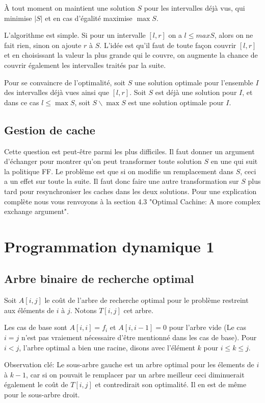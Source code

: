 \documentclass[12pt]{article}
\begin{document}
À tout moment on maintient une solution $S$ pour les intervalles déjà vus, qui minimise $|S|$ et en cas d'égalité maximise $\max S$.

L'algorithme est simple.  Si pour un intervalle $[l,r]$ on a $l\leq max S$, alors on ne fait rien, sinon on ajoute $r$ à $S$.
L'idée est qu'il faut de toute façon couvrir $[l,r]$ et en choisissant la valeur la plus grande qui le couvre, on augmente la chance de couvrir également les intervalles traités par la suite.

Pour se convaincre de l'optimalité, soit $S$ une solution optimale pour l'ensemble $I$ des intervalles déjà vues ainsi que $[l,r]$.  Soit $S$ est déjà une solution pour $I$, et dans ce cas $l\leq \max S$, soit $S\backslash \max S$ est une solution optimale pour $I$.

\subsection{Gestion de cache}

Cette question est peut-être parmi les plus difficiles.  Il faut donner un argument d'échanger pour montrer qu'on peut transformer toute solution $S$ en une qui suit la politique FF.  Le problème est que si on modifie un remplacement dans $S$, ceci a un effet sur toute la suite.  Il faut donc faire une autre transformation sur $S$ plus tard pour resynchroniser les caches dans les deux solutions.  Pour une explication complète nous vous renvoyons à la section 4.3 "Optimal Cachine: A more complex exchange argument".


\section{Programmation dynamique 1}

\subsection{Arbre binaire de recherche optimal}

Soit $A[i,j]$ le coût de l'arbre de recherche optimal pour le problème restreint aux éléments de $i$ à $j$.
 Notons $T[i,j]$ cet arbre.

  Les cas de base sont $A[i,i]=f_i$ et $A[i,i-1]=0$ pour l'arbre vide (Le cas $i=j$ n'est pas vraiement nécessaire d'être mentionné dans les cas de base). 
Pour $i<j$, l'arbre optimal a bien une racine, disons avec l'élément $k$ pour $i\leq k\leq j$.  

Observation clé: Le sous-arbre gauche est un arbre optimal pour les élements de $i$ à $k-1$, car si on pouvait le remplacer par un arbre meilleur ceci diminuerait également le coût de $T[i,j]$ et contredirait son optimalité.  Il en est de même pour le sous-arbre droit.
\end{document}

